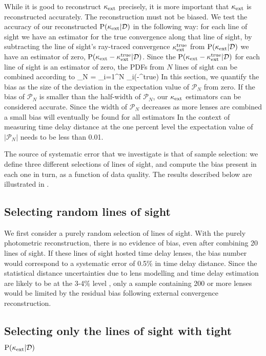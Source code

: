 \documentclass[useAMS,usenatbib,a4paper]{mn2e}
\begin{document}
While it is good to reconstruct $\kappa_{\rm ext}$ precisely, it is more important that
$\kappa_{\rm ext}$ is reconstructed accurately. The reconstruction must not be biased. 
We test the accuracy of our reconstructed ${\rm P}(\kappa_{\rm ext}|{\mathcal{D}})$ in the following
way: for each line of sight we have an estimator for the true convergence along
that line of sight, by subtracting the line of sight's ray-traced convergence
$\kappa_{\rm ext}^{\rm true}$ from ${\rm P}(\kappa_{\rm ext}|{\mathcal{D}})$ we have an estimator of zero, ${\rm P}(\kappa_{\rm ext}-\kappa_{\rm ext}^{\rm true}|{\mathcal{D}})$.
 Since the ${\rm P}(\kappa_{\rm ext}-\kappa_{\rm ext}^{\rm true}|{\mathcal{D}})$ for
each line of sight is an \independant estimator of zero, the PDFs from $N$ lines of sight
can be combined according to
\be
\label{eq:bias}
_N = \prod_{i=1}^N \pr_i(\kappax-\kappax^{\rm true})
\ee
In this section, we quantify the bias as the size of the deviation in the
expectation value of $\mathcal{P}_N$ from zero. If the bias of $\mathcal{P}_N$
is smaller than the half-width of $\mathcal{P}_N$, our $\kappa_{\rm ext}$ estimators can
be considered accurate. Since the width of $\mathcal{P}_N$ decreases as more
lenses are combined a small bias will eventually be found for all estimators
In the context of measuring time delay distance at the one percent level the
expectation value of $|\mathcal{P}_N|$ needs to be less than 0.01.


The source of systematic error that we investigate is that of sample
selection: we define three different selections of lines of sight, and compute
the bias present in each one in turn, as a function of data quality. The
results described below are illustrated in .


\subsection{Selecting random lines of sight}
\label{sec:bias:random}

We first consider a purely random selection of lines of sight. With the purely
photometric reconstruction, there is no evidence of bias, even after combining 20
lines of sight. If these lines of sight hosted time
delay lenses, the bias number would correspond to a systematic error of
0.5\% in time delay distance. Since the statistical distance uncertainties due
to lens modelling and time delay estimation are likely to be at the 3-4\%
level \citep{SuyuEtal2010},  only a sample containing 200 or more lenses would
be limited by the residual bias  following external convergence
reconstruction.


\subsection{Selecting only the lines of sight with tight ${\rm P}(\kappa_{\rm ext}|{\mathcal{D}})$}
\label{sec:bias:tightPDF}
\end{document}
